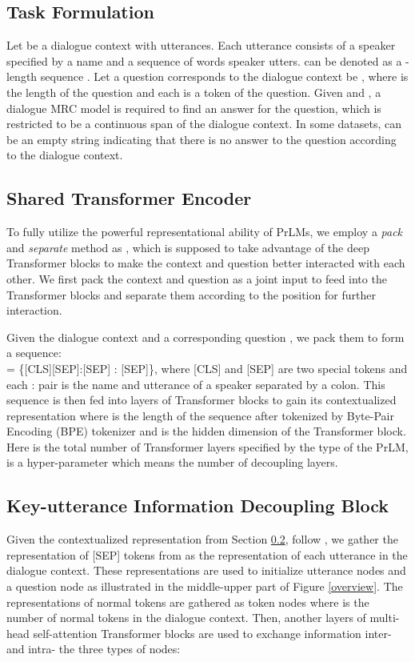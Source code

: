 \documentclass[11pt]{article}
\begin{document}
	\subsection{Task Formulation}
	\label{Task_Formulation}
	Let  be a dialogue context with  utterances. Each utterance  consists of a speaker  specified by a name and a sequence of words  speaker  utters.  can be denoted as a -length sequence . Let a question corresponds to the dialogue context be , where  is the length of the question and each  is a token of the question. Given  and , a dialogue MRC model is required to find an answer  for the question, which is restricted to be a continuous span of the dialogue context. In some datasets,  can be an empty string indicating that there is no answer to the question according to the dialogue context.
	
	\subsection{Shared Transformer Encoder}
	\label{STE}
	To fully utilize the powerful representational ability of PrLMs, we employ a \emph{pack} and \emph{separate} method as \citet{zhang2021multi}, which is supposed to take advantage of the deep Transformer blocks to make the context and question better interacted with each other. We first pack the context and question as a joint input to feed into the Transformer blocks and separate them according to the position for further interaction.
	
	Given the dialogue context  and a corresponding question , we pack them to form a sequence:\\
	 = \{[CLS][SEP]:[SEP]
	: [SEP]\},
	where [CLS] and [SEP] are two special tokens and each : pair is the name and utterance of a speaker separated by a colon. This sequence  is then fed into  layers of Transformer blocks to gain its contextualized representation  where  is the length of the sequence after tokenized by Byte-Pair Encoding (BPE) tokenizer \citep{sennrich2016neural} and  is the hidden dimension of the Transformer block. Here  is the total number of Transformer layers specified by the type of the PrLM,  is a hyper-parameter which means the number of decoupling layers.
	
	\subsection{Key-utterance Information Decoupling Block}
	\label{KIDB}
	Given the contextualized representation  from Section \ref{STE}, follow \citet{zhang2021multi}, we gather the representation of [SEP] tokens from  as the representation of each utterance in the dialogue context. These representations are used to initialize  utterance nodes  and a question node  as illustrated in the middle-upper part of Figure \ref{overview}. The representations of normal tokens are gathered as token nodes  where  is the number of normal tokens in the dialogue context. Then, another  layers of multi-head self-attention Transformer blocks are used to exchange information inter- and intra- the three types of nodes:
	
\end{document}

